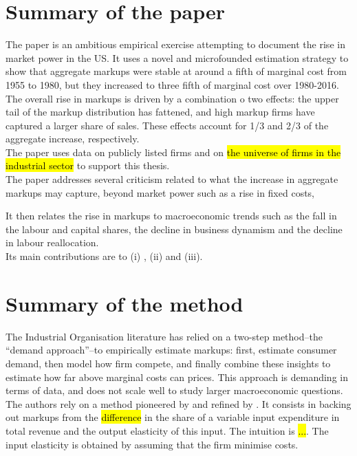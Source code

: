 \documentclass{amsart}
\theoremstyle{definition}
\theoremstyle{remark}
\numberwithin{equation}{section}
\begin{document}
\section{Summary of the paper}

The paper is an ambitious empirical exercise attempting to document the rise in market power in the US. It uses a novel and microfounded estimation strategy to show that aggregate markups were stable at around a fifth of marginal cost from 1955 to 1980, but they increased to three fifth of marginal cost over 1980-2016. The overall rise in markups is driven by a combination o two effects: the upper tail of the markup distribution has fattened, and high markup firms have captured a larger share of sales. These effects account for 1/3 and 2/3 of the aggregate increase, respectively.\\

The paper uses data on publicly listed firms and on \hl{the universe of firms in the industrial sector} to support this thesis.\\

The paper addresses several criticism related to what the increase in aggregate markups may capture, beyond market power such as a rise in fixed costs, 

It then relates the rise in markups to macroeconomic trends such as the fall in the labour and capital shares, the decline in business dynamism and the decline in labour reallocation.\\

Its main contributions are to (i) , (ii) and (iii).

\section{Summary of the method}

The Industrial Organisation literature has relied on a two-step method--the ``demand approach''--to empirically estimate markups: first, estimate consumer demand, then model how firm compete, and finally combine these insights to estimate how far above marginal costs can prices. This approach is demanding in terms of data, and does not scale well to study larger macroeconomic questions.\\

The authors rely on a method pioneered by \cite{hall1988relation} and refined by \cite{de2012markups}. It consists in backing out markups from the \hl{difference} in the share of a variable input expenditure in total revenue and the output elasticity of this input. The intuition is \hl{...}. The input elasticity is obtained by assuming that the firm minimise costs.\\
\end{document}
